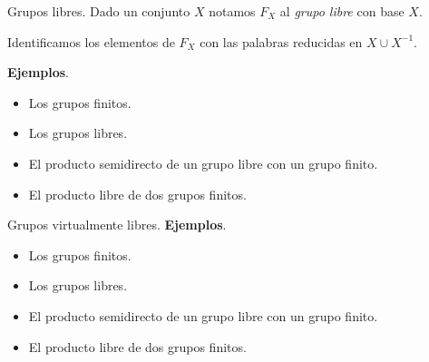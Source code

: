 \documentclass[aspectratio=169, 10pt]{beamer}
\begin{document}
\begin{frame}[fragile]{Grupos libres.}
	Dado un conjunto $X$ notamos $F_{X}$ al \emph{grupo libre} con base $X$.



	\onslide<+->
	Identificamos los elementos de $F_{X}$ con las palabras reducidas en $X \cup X^{-1}$.

		\textbf{Ejemplos}.
			\begin{itemize}
				\item \pause Los grupos finitos.
				\item \pause Los grupos libres.
				\item \pause El producto semidirecto de un grupo libre con un grupo finito.
				\item \pause El producto libre de dos grupos finitos.
			\end{itemize}
\end{frame}

	\begin{frame}[fragile]{Grupos virtualmente libres.}
		\onslide<2->
		\textbf{Ejemplos}.
			\begin{itemize}
				\item \pause Los grupos finitos.
				\item \pause Los grupos libres.
				\item \pause El producto semidirecto de un grupo libre con un grupo finito.
				\item \pause El producto libre de dos grupos finitos.
			\end{itemize}
	\end{frame}
\end{document}
